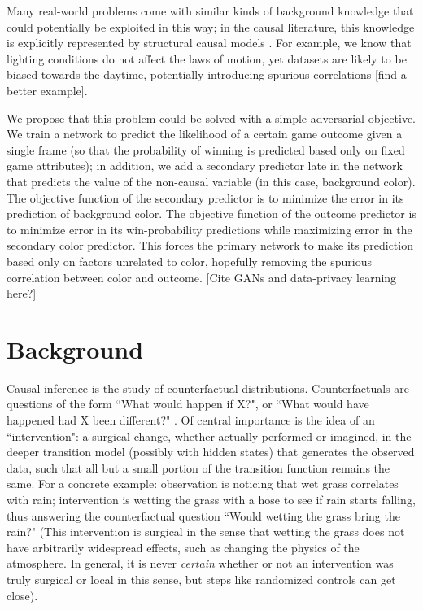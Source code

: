 \documentclass{article}
\begin{document}
Many real-world problems come with similar kinds of background knowledge that could potentially be exploited in this way; in the causal literature, this knowledge is explicitly represented by structural causal models \cite{Pearl2009} \cite{pearl2009causalitybook}. For example, we know that lighting conditions do not affect the laws of motion, yet datasets are likely to be biased towards the daytime, potentially introducing spurious correlations [find a better example].

We propose that this problem could be solved with a simple adversarial objective. We train a network to predict the likelihood of a certain game outcome given a single frame (so that the probability of winning is predicted based only on fixed game attributes); in addition, we add a secondary predictor late in the network that predicts the value of the non-causal variable (in this case, background color). The objective function of the secondary predictor is to minimize the error in its prediction of background color. The objective function of the outcome predictor is to minimize error in its win-probability predictions while maximizing error in the secondary color predictor. This forces the primary network to make its prediction based only on factors unrelated to color, hopefully removing the spurious correlation between color and outcome. [Cite GANs and data-privacy learning here?]


\section{Background}
Causal inference is the study of counterfactual distributions. Counterfactuals are questions of the form ``What would happen if X?", or ``What would have happened had X been different?" \cite{pearl2018theoretical}. Of central importance is the idea of an ``intervention": a surgical change, whether actually performed or imagined, in the deeper transition model (possibly with hidden states) that generates the observed data, such that all but a small portion of the transition function remains the same. For a concrete example: observation is noticing that wet grass correlates with rain; intervention is wetting the grass with a hose to see if rain starts falling, thus answering the counterfactual question ``Would wetting the grass bring the rain?" (This intervention is surgical in the sense that wetting the grass does not have arbitrarily widespread effects, such as changing the physics of the atmosphere. In general, it is never \emph{certain} whether or not an intervention was truly surgical or local in this sense, but steps like randomized controls can get close).
	
\end{document}
